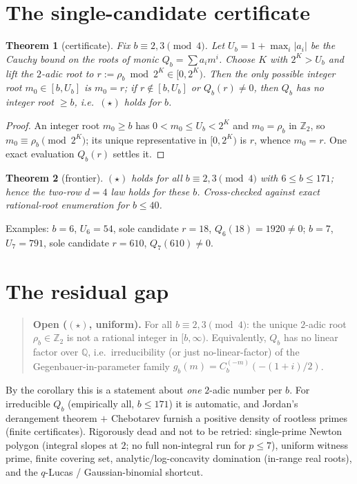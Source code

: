 \documentclass[11pt]{article}
\newtheorem{theorem}{Theorem}
\theoremstyle{definition}
\newcommand{\Z}{\mathbb{Z}}
\newcommand{\Q}{\mathbb{Q}}
\begin{document}
\section{The single-candidate certificate}
\begin{theorem}[certificate]
Fix $b\equiv2,3\pmod4$. Let $U_b=1+\max_i|a_i|$ be the Cauchy bound on the roots of monic
$Q_b=\sum a_i m^i$. Choose $K$ with $2^K>U_b$ and lift the $2$-adic root to
$r:=\rho_b\bmod2^K\in[0,2^K)$. Then the only possible integer root $m_0\in[b,U_b]$ is $m_0=r$; if
$r\notin[b,U_b]$ or $Q_b(r)\ne0$, then $Q_b$ has no integer root $\ge b$, i.e.\ $(\star)$ holds for $b$.
\end{theorem}
\begin{proof}
An integer root $m_0\ge b$ has $0<m_0\le U_b<2^K$ and $m_0=\rho_b$ in $\Z_2$, so $m_0\equiv\rho_b
\pmod{2^K}$; its unique representative in $[0,2^K)$ is $r$, whence $m_0=r$. One exact evaluation
$Q_b(r)$ settles it.
\end{proof}

\begin{theorem}[frontier]
$(\star)$ holds for all $b\equiv2,3\pmod4$ with $6\le b\le171$; hence the two-row $d=4$ law holds
for these $b$. Cross-checked against exact rational-root enumeration for $b\le40$.
\end{theorem}

\noindent Examples: $b=6$, $U_6=54$, sole candidate $r=18$, $Q_6(18)=1920\ne0$; $b=7$, $U_7=791$,
sole candidate $r=610$, $Q_7(610)\ne0$.

\section{The residual gap}
\begin{quote}
\textbf{Open ($(\star)$, uniform).} For all $b\equiv2,3\pmod4$: the unique $2$-adic root
$\rho_b\in\Z_2$ is not a rational integer in $[b,\infty)$. Equivalently, $Q_b$ has no linear factor
over $\Q$, i.e.\ irreducibility (or just no-linear-factor) of the Gegenbauer-in-parameter family
$g_b(m)=C_b^{(-m)}(-(1+i)/2)$.
\end{quote}
By the corollary this is a statement about \emph{one} $2$-adic number per $b$. For irreducible
$Q_b$ (empirically all, $b\le171$) it is automatic, and Jordan's derangement theorem $+$ Chebotarev
furnish a positive density of rootless primes (finite certificates). Rigorously dead and not to be
retried: single-prime Newton polygon (integral slopes at $2$; no full non-integral run for
$p\le7$), uniform witness prime, finite covering set, analytic/log-concavity domination (in-range
real roots), and the $q$-Lucas / Gaussian-binomial shortcut.
\end{document}
